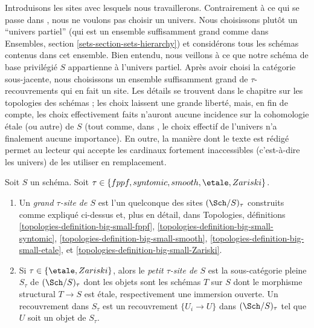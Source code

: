 \medskip\noindent
Introduisons les sites avec lesquels nous travaillerons.
Contrairement \`a ce qui se passe dans
\cite{SGA4}, nous ne voulons pas choisir un univers. Nous choisissons plut\^ot un ``univers
partiel'' (qui est un ensemble suffisamment grand comme dans
Ensembles, section \ref{sets-section-sets-hierarchy}) et consid\'erons tous les sch\'emas
contenus dans cet ensemble. Bien entendu, nous veillons \`a ce que notre sch\'ema de base privil\'egi\'e
$S$ appartienne \`a l'univers partiel. Apr\`es avoir choisi la cat\'egorie sous-jacente,
nous choisissons un ensemble suffisamment grand de $\tau$-recouvrements qui en fait un site.
Les d\'etails se trouvent dans le chapitre sur les topologies des sch\'emas ; les choix
laissent une grande libert\'e, mais, en fin de compte, les choix effectivement faits n'auront
aucune incidence sur la cohomologie \'etale (ou autre) de $S$ (tout comme, dans \cite{SGA4},
le choix effectif de l'univers n'a finalement aucune importance). En outre, la mani\`ere dont le
texte est r\'edig\'e permet au lecteur qui accepte les cardinaux fortement inaccessibles
(c'est-\`a-dire les univers) de les utiliser en remplacement.

\begin{definition}
\label{definition-tau-site}
Soit $S$ un sch\'ema.
Soit $\tau \in \{fppf, syntomic, smooth, \etale, \linebreak[0] Zariski\}$.
\begin{enumerate}
\item Un {\it grand $\tau$-site de $S$} est l'un quelconque des sites
$(\Sch/S)_\tau$ construits comme expliqu\'e ci-dessus et, plus en d\'etail, dans
Topologies, définitions
\ref{topologies-definition-big-small-fppf},
\ref{topologies-definition-big-small-syntomic},
\ref{topologies-definition-big-small-smooth},
\ref{topologies-definition-big-small-etale}, et
\ref{topologies-definition-big-small-Zariski}.
\item Si $\tau \in \{\etale, Zariski\}$, alors le
{\it petit $\tau$-site de $S$}
est la sous-cat\'egorie pleine $S_\tau$ de $(\Sch/S)_\tau$ dont les objets
sont les sch\'emas $T$ sur $S$ dont le morphisme structural $T \to S$ est \'etale,
respectivement une immersion ouverte. Un recouvrement dans $S_\tau$ est un recouvrement
$\{U_i \to U\}$ dans $(\Sch/S)_\tau$
tel que $U$ soit un objet de $S_\tau$.
\end{enumerate}
\end{definition}

